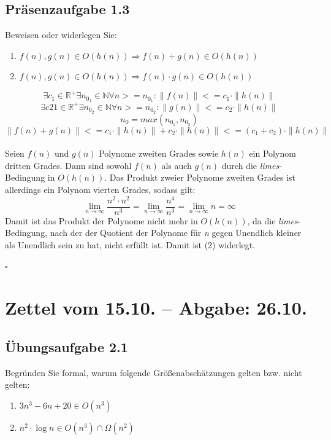 \documentclass{article}
\begin{document}
\subsection{Präsenzaufgabe 1.3}
Beweisen oder widerlegen Sie:
\begin{enumerate}
	\item $ f(n),g(n) \in O(h(n)) \Rightarrow f(n)+g(n) \in O(h(n)) $
	\item $ f(n),g(n) \in O(h(n)) \Rightarrow f(n) \cdot g(n) \in O(h(n)) $
\end{enumerate}
\vspace{1cm}
\[
	\exists c_1 \in \mathbb{R}^+ \exists n_{0_1} \in \mathbb{N} \forall n >= n_{0_1} : \|f(n)\| <= c_1 \cdot \|h(n)\|
\]
\[
	\exists c21 \in \mathbb{R}^+ \exists n_{0_2} \in \mathbb{N} \forall n >= n_{0_2} : \|g(n)\| <= c_2 \cdot \|h(n)\|
\]
\[
	n_0 = max(n_{0_1},n_{0_2})
\]
\[
	\|f(n)+g(n)\| <= c_1\cdot\|h(n)\|+c_2\cdot\|h(n)\| <= (c_1+c_2)\cdot\|h(n)\|
\]
\vspace{0.5cm}\\
Seien $f(n)$ und $g(n)$ Polynome zweiten Grades sowie $h(n)$ ein Polynom dritten Grades.
Dann sind sowohl $f(n)$ als auch $g(n)$ durch die \textit{limes}-Bedingung in $O(h(n))$.
Das Produkt zweier Polynome zweiten Grades ist allerdings ein Polynom vierten Grades, sodass gilt:
\begin{equation*}
	\lim_{n\rightarrow\infty}\frac{n^2 \cdot n^2}{n^3}=\lim_{n\rightarrow\infty}\frac{n^4}{n^3}=\lim_{n\rightarrow\infty}n=\infty
\end{equation*}
Damit ist das Produkt der Polynome nicht mehr in $O(h(n))$, da die \textit{limes}-Bedingung, nach der der Quotient der Polynome für \textit{n} gegen Unendlich kleiner als Unendlich sein zu hat, nicht erfüllt ist.
Damit ist (2) widerlegt.
\begin{flushright}
$\square$
\end{flushright}
\newpage
\section{Zettel vom 15.10. -- Abgabe: 26.10.}
\subsection{Übungsaufgabe 2.1}
\begin{flushright}
\begin{Large}
[~~~~\string| ~~2~]
\end{Large}
\end{flushright}
Begründen Sie formal, warum folgende Größenabschätzungen gelten bzw. nicht gelten:
\begin{enumerate}
	\item $3n^3-6n+20 \in O(n^3)$
	\item $n^2 \cdot \operatorname{log} n \in O(n^3) \cap \Omega(n^2)$
\end{enumerate}
\vspace{1cm}
\end{document}

